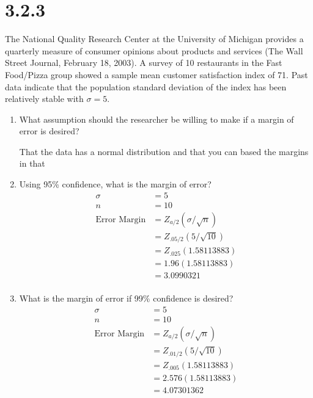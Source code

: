 \documentclass{article}
\begin{document}
\pagebreak

\section*{3.2.3}
The National Quality Research Center at the University of Michigan provides a quarterly measure of consumer opinions about products and services (The Wall Street Journal, February 18, 2003). A survey of 10 restaurants in the Fast Food/Pizza group showed a sample mean customer satisfaction index of 71. Past data indicate that the population standard deviation of the index has been relatively stable with $\sigma = 5$.
\begin{enumerate}
  \item What assumption should the researcher be willing to make if a margin of error is desired?

  That the data has a normal distribution and that you can based the margins in that

  \item Using 95\% confidence, what is the margin of error?
  \begin{align*}
    \sigma &= 5\\
    n &= 10\\
    \text{Error Margin} &= Z_{a/2}(\sigma / \sqrt{n})\\
    &=Z_{.05/2}(5/ \sqrt{10})\\
    &=Z_{.025}(1.58113883)\\
    &=1.96(1.58113883)\\
    &=3.0990321\\
  \end{align*}

  \item What is the margin of error if 99\% confidence is desired?
  \begin{align*}
    \sigma &= 5\\
    n &= 10\\
    \text{Error Margin} &= Z_{a/2}(\sigma / \sqrt{n})\\
    &=Z_{.01/2}(5/ \sqrt{10})\\
    &=Z_{.005}(1.58113883)\\
    &=2.576(1.58113883)\\
    &=4.07301362\\
  \end{align*}
\end{enumerate}
\end{document}
